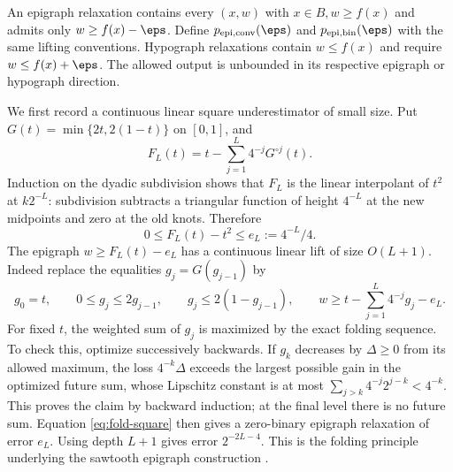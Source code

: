 An epigraph relaxation contains every $(x,w)$ with $x\in B,w\ge f(x)$
and admits only $w\ge f(x)-\eps$. Define
$p_{\mathrm{epi,conv}}(\eps)$ and $p_{\mathrm{epi,bin}}(\eps)$ with the
same lifting conventions. Hypograph relaxations contain $w\le f(x)$
and require $w\le f(x)+\eps$. The allowed output is unbounded in its
respective epigraph or hypograph direction.

We first record a continuous linear square underestimator of small
size. Put $G(t)=\min\{2t,2(1-t)\}$ on $[0,1]$, and
\[
 F_L(t)=t-\sum_{j=1}^L4^{-j}G^{\circ j}(t).
\]
Induction on the dyadic subdivision shows that $F_L$ is the linear
interpolant of $t^2$ at $k2^{-L}$: subdivision subtracts a triangular
function of height $4^{-L}$ at the new midpoints and zero at the old
knots. Therefore
\begin{equation}\label{eq:fold-square}
 0\le F_L(t)-t^2\le e_L:=4^{-L}/4.
\end{equation}
The epigraph $w\ge F_L(t)-e_L$ has a continuous linear lift of size
$O(L+1)$. Indeed replace the equalities $g_j=G(g_{j-1})$ by
\[
 g_0=t,\qquad 0\le g_j\le2g_{j-1},\qquad
 g_j\le2(1-g_{j-1}),\qquad
 w\ge t-\sum_{j=1}^L4^{-j}g_j-e_L.
\]
For fixed $t$, the weighted sum of $g_j$ is maximized by the exact
folding sequence. To check this, optimize successively backwards. If
$g_k$ decreases by $\Delta\ge0$ from its allowed maximum, the loss
$4^{-k}\Delta$ exceeds the largest possible gain in the optimized
future sum, whose Lipschitz constant is at most
$\sum_{j>k}4^{-j}2^{j-k}<4^{-k}$. This proves the claim by backward
induction; at the final level there is no future sum. Equation
\eqref{eq:fold-square} then gives a zero-binary epigraph relaxation of
error $e_L$. Using depth $L+1$ gives error $2^{-2L-4}$. This is the
folding principle underlying the sawtooth epigraph construction
\citep{beach2024}.

